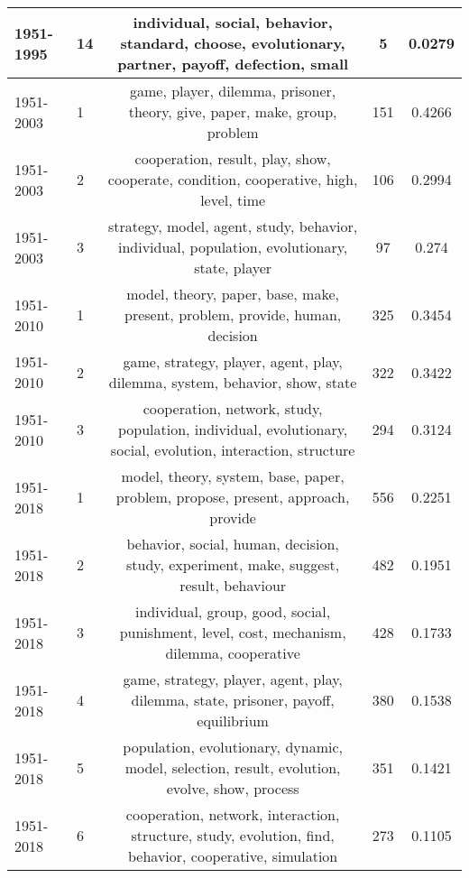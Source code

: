 \begin{tabular}{llccc}
 1951-1995 &              14 &               individual, social, behavior, standard, choose, evolutionary, partner, payoff, defection, small &                5 &                  0.0279 \\
 \midrule
 1951-2003 &               1 &                                    game, player, dilemma, prisoner, theory, give, paper, make, group, problem &              151 &                  0.4266 \\
 1951-2003 &               2 &                         cooperation, result, play, show, cooperate, condition, cooperative, high, level, time &              106 &                  0.2994 \\
 1951-2003 &               3 &                  strategy, model, agent, study, behavior, individual, population, evolutionary, state, player &               97 &                   0.274 \\
 \midrule
 1951-2010 &               1 &                                  model, theory, paper, base, make, present, problem, provide, human, decision &              325 &                  0.3454 \\
 1951-2010 &               2 &                                   game, strategy, player, agent, play, dilemma, system, behavior, show, state &              322 &                  0.3422 \\
 1951-2010 &               3 &  cooperation, network, study, population, individual, evolutionary, social, evolution, interaction, structure &              294 &                  0.3124 \\
 \midrule
 1951-2018 &               1 &                              model, theory, system, base, paper, problem, propose, present, approach, provide &              556 &                  0.2251 \\
 1951-2018 &               2 &                        behavior, social, human, decision, study, experiment, make, suggest, result, behaviour &              482 &                  0.1951 \\
 1951-2018 &               3 &                     individual, group, good, social, punishment, level, cost, mechanism, dilemma, cooperative &              428 &                  0.1733 \\
 1951-2018 &               4 &                            game, strategy, player, agent, play, dilemma, state, prisoner, payoff, equilibrium &              380 &                  0.1538 \\
 1951-2018 &               5 &                 population, evolutionary, dynamic, model, selection, result, evolution, evolve, show, process &              351 &                  0.1421 \\
 1951-2018 &               6 &       cooperation, network, interaction, structure, study, evolution, find, behavior, cooperative, simulation &              273 &                  0.1105 \\
\bottomrule
\end{tabular}
